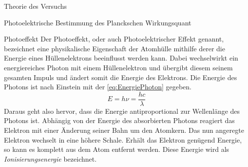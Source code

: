 \documentclass[pdftex, a4paper,11pt, twoside, ngerman]{report}
\begin{document}
\begin{chapter}{Theorie des Versuchs}
\begin{section}{Photoelektrische Bestimmung des Planckschen Wirkungsquant}
      \begin{subsection}{Photoeffekt}
        \label{chp:TheoriePhotoelektrischesWirkungsquantumPhotoeffekt}
        Der Photoeffekt, oder auch Photoelektrischer Effekt genannt, bezeichnet
        eine physikalische Eigenschaft der Atomhülle mithilfe derer die
        Energie eines Hüllenelektrons beeinflusst werden kann. Dabei
        wechselwirkt ein energiereiches Photon mit einem Hüllenelektron und
        übergibt diesem seinem gesamten Impuls und ändert somit die Energie
        des Elektrons. Die Energie des Photons ist nach Einstein mit der
        \cref{eq:EnergiePhoton} gegeben.
        \begin{equation}
          \label{eq:EnergiePhoton}
          E=h\nu=\frac{hc}{\lambda}
        \end{equation}
        Daraus geht also hervor, dass die Energie antiproportional zur 
        Wellenlänge des Photons ist. Abhängig von der Energie des absorbierten 
        Photons reagiert das Elektron mit einer Änderung seiner Bahn um den 
        Atomkern. Das nun angeregte Elektron wechselt in eine höhere Schale. 
        Erhält das Elektron genügend Energie, so kann es komplett aus dem Atom 
        entfernt werden. Diese Energie wird als \textit{Ionisierungsenergie} 
        bezeichnet.
        
        

\end{subsection}
\end{section}
\end{chapter}
\end{document}
